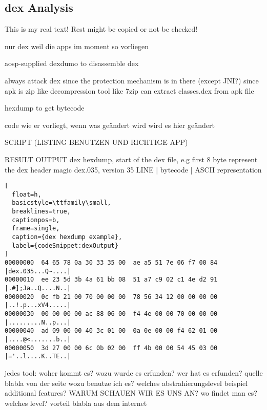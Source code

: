 \subsection{dex Analysis} \label{subsubsection:tools-dex}
This is my real text! Rest might be copied or not be checked!


%
nur dex weil die apps im moment so vorliegen

aosp-supplied dexdumo to disassemble dex

\cite{andevconDalvikART}
%
%
always attack dex since the protection mechanism is in there (except JNI?)
since apk is zip like decompression tool like 7zip can extract classes.dex from apk file

hexdump to get bytecode


code wie er vorliegt, wenn was geändert wird wird es hier geändert



SCRIPT (LISTING BENUTZEN UND RICHTIGE APP)

RESULT OUTPUT
dex hexdump, start of the dex file, e.g first 8 byte represent the dex header magic dex.035, version 35\cite{developersDalvik}
LINE | bytecode | ASCII representation
\begin{lstlisting}[
  float=h,
  basicstyle=\ttfamily\small,
  breaklines=true,
  captionpos=b,
  frame=single,
  caption={dex hexdump example},
  label={codeSnippet:dexOutput}
]
00000000  64 65 78 0a 30 33 35 00  ae a5 51 7e 06 f7 00 84  |dex.035...Q~....|
00000010  ee 23 5d 3b 4a 61 bb 08  51 a7 c9 02 c1 4e d2 91  |.#];Ja..Q....N..|
00000020  0c fb 21 00 70 00 00 00  78 56 34 12 00 00 00 00  |..!.p...xV4.....|
00000030  00 00 00 00 ac 88 06 00  f4 4e 00 00 70 00 00 00  |.........N..p...|
00000040  ad 09 00 00 40 3c 01 00  0a 0e 00 00 f4 62 01 00  |....@<.......b..|
00000050  3d 27 00 00 6c 0b 02 00  ff 4b 00 00 54 45 03 00  |='..l....K..TE..|
\end{lstlisting}





jedes tool:\newline
woher kommt es?\newline
wozu wurde es erfunden?\newline
wer hat es erfunden? quelle\newline
blabla von der seite\newline
wozu benutze ich es?\newline
welches abstrahierungslevel\newline
beispiel\newline
additional features?\newline
WARUM SCHAUEN WIR ES UNS AN?\newline
wo findet man es?\newline
welches level?\newline
vorteil\newline
blabla aus dem internet\newline
